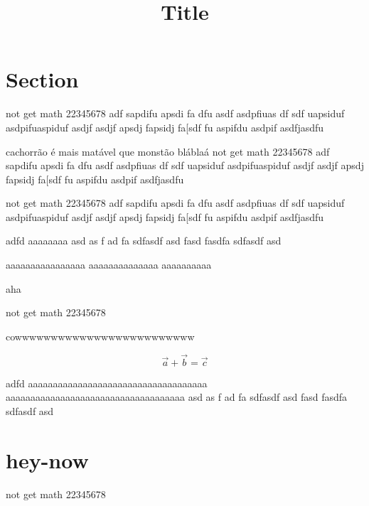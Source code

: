 \documentclass[12pt,a4paper]{article}
\begin{document}
\title{Title}
\author{}
\date{}
\maketitle


\setlength{\parindent}{0pt}

\setlength{\parskip}{\baselineskip}

\section{Section}

not get math 22345678 adf sapdifu apsdi fa dfu asdf asdpfiuas df
sdf uapsiduf asdpifuaspiduf asdjf asdjf apsdj fapsidj fa[sdf
fu aspifdu asdpif asdfjasdfu

cachorrão é mais matável que monstão bláblaá
not get math 22345678 adf sapdifu apsdi fa dfu asdf asdpfiuas df
sdf uapsiduf asdpifuaspiduf asdjf asdjf apsdj fapsidj fa[sdf
fu aspifdu asdpif asdfjasdfu

not get math 22345678 adf sapdifu apsdi fa dfu asdf asdpfiuas df
sdf uapsiduf asdpifuaspiduf asdjf asdjf apsdj fapsidj fa[sdf
fu aspifdu asdpif asdfjasdfu

adfd
aaaaaaaa
asd
as
f
ad
fa
sdfasdf
asd
fasd
fasdfa
sdfasdf
asd

aaaaaaaaaaaaaaaa
aaaaaaaaaaaaaa
aaaaaaaaaa

aha

\begin{description}[labelindent=+0.5cm]
\item[hey-now, math] not get math 22345678
\item[cow] cowwwwwwwwwwwwwwwwwwwwwwwww
\item[ahaha] $$\vec{a} + \vec{b} = \vec{c}$$
\item[new, new, newa, newa] adfd
aaaaaaaaaaaaaaaaaaaaaaaaaaaaaaaaaaaa
aaaaaaaaaaaaaaaaaaaaaaaaaaaaaaaaaaaa
asd
as
f
ad
fa
sdfasdf
asd
fasd
fasdfa
sdfasdf
asd
\end{description}

\section{hey-now}

not get math 22345678
\end{document}
